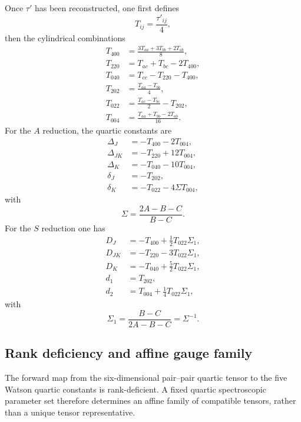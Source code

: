 \documentclass[journal=jacsat,manuscript=article]{achemso}
\begin{document}
Once $\tau'$ has been reconstructed, one first defines
\begin{equation}
T_{ij} = \frac{\tau'_{ij}}{4},
\end{equation}
then the cylindrical combinations
\begin{align}
T_{400} &= \frac{3T_{aa}+3T_{bb}+2T_{ab}}{8}, \\
T_{220} &= T_{ac}+T_{bc}-2T_{400}, \\
T_{040} &= T_{cc}-T_{220}-T_{400}, \\
T_{202} &= \frac{T_{aa}-T_{bb}}{4}, \\
T_{022} &= \frac{T_{ac}-T_{bc}}{2}-T_{202}, \\
T_{004} &= \frac{T_{aa}+T_{bb}-2T_{ab}}{16}.
\end{align}
For the $A$ reduction, the quartic constants are
\begin{align}
\Delta_J   &= -T_{400}-2T_{004}, \\
\Delta_{JK}&= -T_{220}+12T_{004}, \\
\Delta_K   &= -T_{040}-10T_{004}, \\
\delta_J   &= -T_{202}, \\
\delta_K   &= -T_{022}-4\Sigma T_{004},
\end{align}
with
\begin{equation}
\Sigma = \frac{2A-B-C}{B-C}.
\end{equation}
For the $S$ reduction one has
\begin{align}
D_J   &= -T_{400}+\frac12 T_{022}\Sigma_1, \\
D_{JK}&= -T_{220}-3T_{022}\Sigma_1, \\
D_K   &= -T_{040}+\frac52 T_{022}\Sigma_1, \\
d_1   &= T_{202}, \\
d_2   &= T_{004}+\frac14 T_{022}\Sigma_1,
\end{align}
with
\begin{equation}
\Sigma_1 = \frac{B-C}{2A-B-C} = \Sigma^{-1}.
\end{equation}

\subsection{Rank deficiency and affine gauge family}

The forward map from the six-dimensional pair--pair quartic tensor to the five
Watson quartic constants is rank-deficient. A fixed quartic spectroscopic
parameter set therefore determines an affine family of compatible tensors,
rather than a unique tensor representative.
\end{document}
